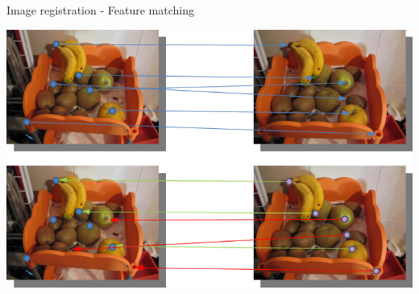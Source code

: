 \begin{frame}{Image registration - Feature matching}
  \begin{center}
    \includegraphics[width=\textwidth]{oFlowMatching}
  \end{center}

  \note {
  
  }
\end{frame}

